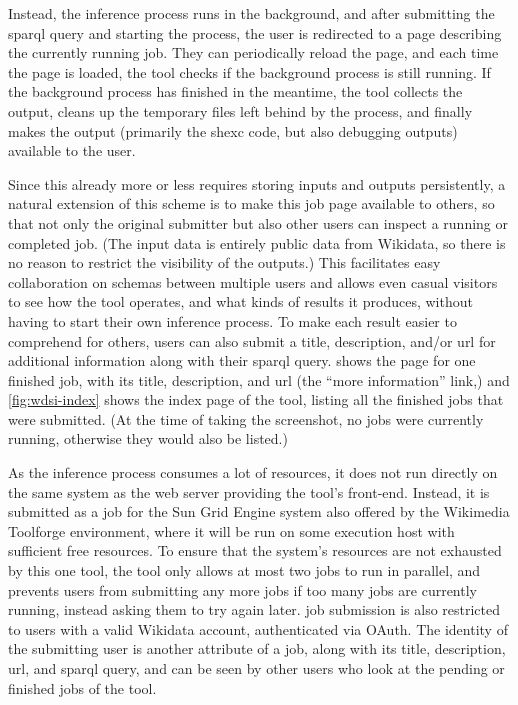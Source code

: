 Instead, the inference process runs in the background,
and after submitting the \gls{sparql} query and starting the process,
the user is redirected to a page describing the currently running \gls{job}.
They can periodically reload the page,
and each time the page is loaded,
the tool checks if the background process is still running.
If the background process has finished in the meantime,
the tool collects the output,
cleans up the temporary files left behind by the process,
and finally makes the output
(primarily the \gls{shexc} code, but also debugging outputs)
available to the user.

Since this already more or less requires storing inputs and outputs persistently,
a natural extension of this scheme is to make this \gls{job} page available to others,
so that not only the original submitter but also other users can inspect a running or completed \gls{job}.
(The input data is entirely public data from \gls{Wikidata},
so there is no reason to restrict the visibility of the outputs.)
This facilitates easy collaboration on \glspl{schema} between multiple users
and allows even casual visitors to see how the tool operates,
and what kinds of results it produces,
without having to start their own inference process.
To make each result easier to comprehend for others,
users can also submit a title, description, and/or \gls{url} for additional information
along with their \gls{sparql} query.
 shows the page for one finished \gls{job},
with its title, description, and \gls{url} (the “more information” link,)
and \cref{fig:wdsi-index} shows the index page of the tool,
listing all the finished jobs that were submitted.
(At the time of taking the screenshot,
no jobs were currently running,
otherwise they would also be listed.)

As the inference process consumes a lot of resources,
it does not run directly on the same system as the web server providing the tool’s front-end.
Instead, it is submitted as a job for the Sun Grid Engine system also offered by the \gls{Wikimedia Toolforge} environment,
where it will be run on some execution host with sufficient free resources.
To ensure that the system’s resources are not exhausted by this one tool,
the tool only allows at most two \glspl{job} to run in parallel,
and prevents users from submitting any more \glspl{job} if too many \glspl{job} are currently running,
instead asking them to try again later.
\Gls{job} submission is also restricted to users with a valid \gls{Wikidata} account,
authenticated via OAuth.
The identity of the submitting user is another attribute of a \gls{job},
along with its title, description, \gls{url}, and \gls{sparql} query,
and can be seen by other users who look at the pending or finished \glspl{job} of the tool.

